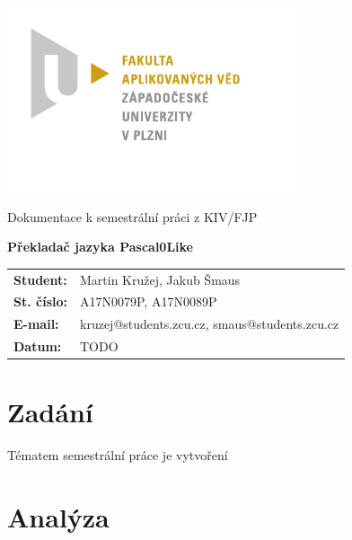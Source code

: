 \documentclass[
12pt,
a4paper,
pdftex,
czech,
titlepage
]{report}
\begin{document}
\begin{titlepage}
	\vspace*{-2cm}
	{\centering\includegraphics[scale=1.5]{FAV_logo.pdf}\par}
	\centering
	\vspace*{2cm}
	{\Large Dokumentace k semestrální práci z KIV/FJP\par}
	\vspace{1.0cm}
	{\Huge\bfseries Překladač jazyka Pascal0Like\par}
	\vspace{7cm}

	\begin{flushleft} 
	\begin{table}[ht]
	\label{stats}
	\begin{tabular}{ll}
	\textbf{Student:}  & Martin Kružej, Jakub Šmaus   \\
	\textbf{St. číslo:}   & A17N0079P, A17N0089P    \\
	\textbf{E-mail:}  & kruzej@students.zcu.cz, smaus@students.zcu.cz  \\
	\textbf{Datum:}    & TODO            \\ 
	\end{tabular}
	\end{table}
	\end{flushleft}
	
	\vfill


\end{titlepage}

\tableofcontents
\thispagestyle{empty}
\clearpage

\chapter{Zadání}
\setcounter{page}{1}
Tématem semestrální práce je vytvoření

\chapter{Analýza}
\end{document}
